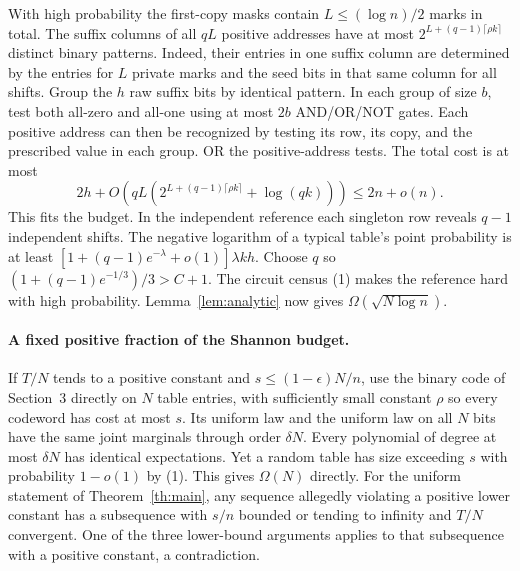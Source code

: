 \documentclass[11pt]{article}
\begin{document}
With high probability the first-copy masks contain $L\le (\log n)/2$ marks in total. The suffix columns of all $qL$ positive addresses have at most $2^{L+(q-1)\lceil\rho k\rceil}$ distinct binary patterns. Indeed, their entries in one suffix column are determined by the entries for $L$ private marks and the seed bits in that same column for all shifts. Group the $h$ raw suffix bits by identical pattern. In each group of size $b$, test both all-zero and all-one using at most $2b$ AND/OR/NOT gates. Each positive address can then be recognized by testing its row, its copy, and the prescribed value in each group. OR the positive-address tests. The total cost is at most
\[
            2h+O\!\left(qL(2^{L+(q-1)\lceil\rho k\rceil}+\log(qk))\right)
              \le 2n+o(n).
\]
This fits the budget. In the independent reference each singleton row reveals $q-1$ independent shifts. The negative logarithm of a typical table's point probability is at least
$[1+(q-1)e^{-\lambda}+o(1)]\lambda k h$.
Choose $q$ so $(1+(q-1)e^{-1/3})/3>C+1$. The circuit census (1) makes the reference hard with high probability. Lemma~\ref{lem:analytic} now gives $\Omega(\sqrt{N\log n})$.

\paragraph{A fixed positive fraction of the Shannon budget.}
If $T/N$ tends to a positive constant and $s\le(1-\epsilon)N/n$, use the binary code of Section~3 directly on $N$ table entries, with sufficiently small constant $\rho$ so every codeword has cost at most $s$. Its uniform law and the uniform law on all $N$ bits have the same joint marginals through order $\delta N$. Every polynomial of degree at most $\delta N$ has identical expectations. Yet a random table has size exceeding $s$ with probability $1-o(1)$ by (1). This gives $\Omega(N)$ directly. For the uniform statement of Theorem~\ref{th:main}, any sequence allegedly violating a positive lower constant has a subsequence with $s/n$ bounded or tending to infinity and $T/N$ convergent. One of the three lower-bound arguments applies to that subsequence with a positive constant, a contradiction.





\end{document}
